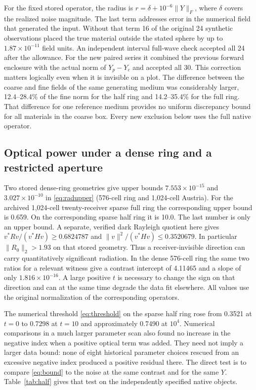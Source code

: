 \documentclass[anonymous,12pt]{iopjournal}
\theoremstyle{remark}\newtheorem{remark}[theorem]{Remark}
\numberwithin{equation}{section}
\begin{document}
For the fixed stored operator, the radius is $r=\delta+10^{-6}\|Y\|_F$, where $\delta$ covers the realized noise magnitude. The last term addresses error in the numerical field that generated the input. Without that term 16 of the original 24 synthetic observations placed the true material outside the stated sphere by up to $1.87\times10^{-11}$ field units. An independent interval full-wave check accepted all 24 after the allowance. For the new paired series it combined the previous forward enclosure with the actual norm of $Y_p-Y_c$ and accepted all 30. This correction matters logically even when it is invisible on a plot. The difference between the coarse and fine fields of the same generating medium was considerably larger, 12.4--28.4\% of the fine norm for the half ring and 14.2--35.4\% for the full ring. That difference for one reference medium provides no uniform discrepancy bound for all materials in the coarse box. Every new exclusion below uses the full native operator.

\subsection{Optical power under a dense ring and a restricted aperture}
Two stored dense-ring geometries give upper bounds $7.553\times10^{-15}$ and $3.027\times10^{-10}$ in \eqref{eq:radupper} (576-cell ring and 1,024-cell Austria). For the archived 1,024-cell twenty-receiver sparse full ring the corresponding upper bound is 0.659. On the corresponding sparse half ring it is 10.0. The last number is only an upper bound. A separate, verified dark Rayleigh quotient here gives $v^*Rv/(v^*Hv)\ge0.6824787$ and $\|v\|^2/(v^*Hv)\le0.3520679$. In particular $\|R_0\|_2>1.93$ on that stored geometry. Thus a receiver-invisible direction can carry quantitatively significant radiation. In the dense 576-cell ring the same two ratios for a relevant witness give a contrast intercept of 4.11465 and a slope of only $1.816\times10^{-16}$. A large positive $t$ is necessary to change the sign on that direction and can at the same time degrade the data fit elsewhere. All values use the original normalization of the corresponding operators.

The numerical threshold \eqref{eq:threshold} on the sparse half ring rose from 0.3521 at $t=0$ to 0.7298 at $t=10$ and approximately 0.7490 at $10^4$. Numerical comparisons in a much larger parameter scan also found no increase in the negative index when a positive optical term was added. They need not imply a larger data bound: none of eight historical parameter choices rescued from an excessive negative index produced a positive residual there. The direct test is to compare \eqref{eq:bound} to the noise at the same contrast and for the same $Y$. Table~\ref{tab:half} gives that test on the independently specified native objects.
\end{document}
